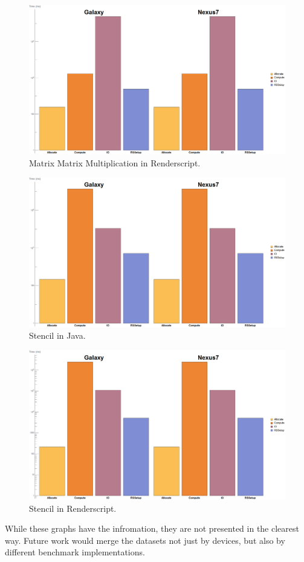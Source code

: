 \begin{figure}[t!]
\includegraphics[scale=0.125]{SgemmRS.png}
\caption{Matrix Matrix Multiplication in Renderscript.}
\label{fig:schedule}
\centering
\end{figure}



\begin{figure}[t!]
\includegraphics[scale=0.125]{StencilJava.png}
\caption{Stencil in Java.}
\label{fig:schedule}
\centering
\end{figure}

\begin{figure}[t!]
\includegraphics[scale=0.125]{StencilRSBase.png}
\caption{Stencil in Renderscript.}
\label{fig:schedule}
\centering
\end{figure}


While these graphs have the infromation, they are not presented in the clearest way.
Future work would merge the datasets not just by devices, but also by different benchmark implementations.

